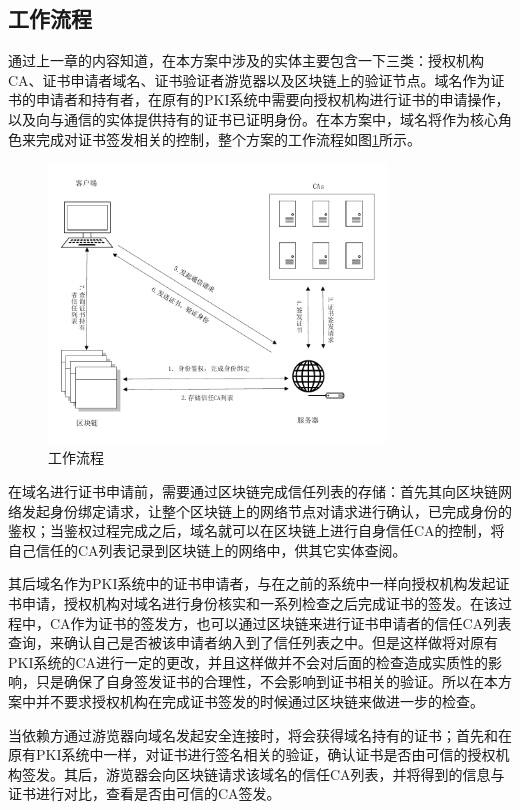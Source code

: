 \subsection{工作流程}

通过上一章的内容知道，在本方案中涉及的实体主要包含一下三类：授权机构CA、证书申请者域名、证书验证者游览器以及区块链上的验证节点。域名作为证书的申请者和持有者，在原有的PKI系统中需要向授权机构进行证书的申请操作，以及向与通信的实体提供持有的证书已证明身份。在本方案中，域名将作为核心角色来完成对证书签发相关的控制，整个方案的工作流程如图\ref{fig:art}所示。

\begin{figure}[htbp]
 	\centering
 	\includegraphics[width = 0.8\textwidth]{img/art}
 	\caption{工作流程}\label{fig:art}
\end{figure}

在域名进行证书申请前，需要通过区块链完成信任列表的存储：首先其向区块链网络发起身份绑定请求，让整个区块链上的网络节点对请求进行确认，已完成身份的鉴权；当鉴权过程完成之后，域名就可以在区块链上进行自身信任CA的控制，将自己信任的CA列表记录到区块链上的网络中，供其它实体查阅。

其后域名作为PKI系统中的证书申请者，与在之前的系统中一样向授权机构发起证书申请，授权机构对域名进行身份核实和一系列检查之后完成证书的签发。在该过程中，CA作为证书的签发方，也可以通过区块链来进行证书申请者的信任CA列表查询，来确认自己是否被该申请者纳入到了信任列表之中。但是这样做将对原有PKI系统的CA进行一定的更改，并且这样做并不会对后面的检查造成实质性的影响，只是确保了自身签发证书的合理性，不会影响到证书相关的验证。所以在本方案中并不要求授权机构在完成证书签发的时候通过区块链来做进一步的检查。

当依赖方通过游览器向域名发起安全连接时，将会获得域名持有的证书；首先和在原有PKI系统中一样，对证书进行签名相关的验证，确认证书是否由可信的授权机构签发。其后，游览器会向区块链请求该域名的信任CA列表，并将得到的信息与证书进行对比，查看是否由可信的CA签发。


